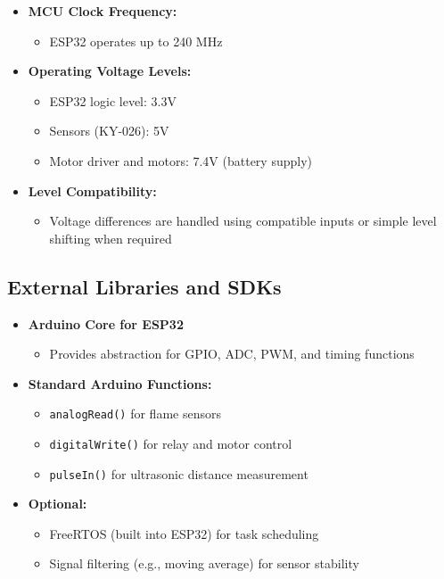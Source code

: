 \documentclass[12pt]{article}
\begin{document}
\begin{itemize}
    \item \textbf{MCU Clock Frequency:}
    \begin{itemize}
        \item ESP32 operates up to 240 MHz
    \end{itemize}

    \item \textbf{Operating Voltage Levels:}
    \begin{itemize}
        \item ESP32 logic level: 3.3V
        \item Sensors (KY-026): 5V
        \item Motor driver and motors: 7.4V (battery supply)
    \end{itemize}

    \item \textbf{Level Compatibility:}
    \begin{itemize}
        \item Voltage differences are handled using compatible inputs or simple level shifting when required
    \end{itemize}
\end{itemize}

\subsection{External Libraries and SDKs}

\begin{itemize}
    \item \textbf{Arduino Core for ESP32}
    \begin{itemize}
        \item Provides abstraction for GPIO, ADC, PWM, and timing functions
    \end{itemize}

    \item \textbf{Standard Arduino Functions:}
    \begin{itemize}
        \item \texttt{analogRead()} for flame sensors
        \item \texttt{digitalWrite()} for relay and motor control
        \item \texttt{pulseIn()} for ultrasonic distance measurement
    \end{itemize}

    \item \textbf{Optional:}
    \begin{itemize}
        \item FreeRTOS (built into ESP32) for task scheduling
        \item Signal filtering (e.g., moving average) for sensor stability
    \end{itemize}
\end{itemize}
\end{document}
